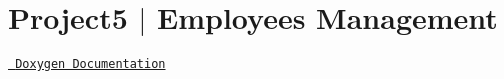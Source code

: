 \chapter{Project5 \texorpdfstring{$\vert$}{|} Employees Management}
\hypertarget{md__r_e_a_d_m_e}{}\label{md__r_e_a_d_m_e}
\label{md__r_e_a_d_m_e_autotoc_md0}%
%
\href{https://TylerDdao.github.io/Project5_HR/html/index.html}{\texttt{ Doxygen Documentation}} 